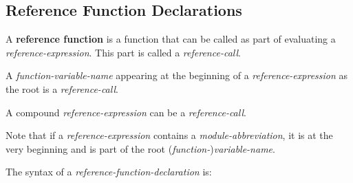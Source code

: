 \documentclass[12pt]{article}
\newcommand{\key}[1]{{\rm \bfseries #1}}
\begin{document}
\subsection{Reference Function Declarations}
\label{REFERENCE-FUNCTION-DECLARATIONS}

A \key{reference function} is a function that can be
called as part of evaluating a {\em reference-expression}.
This part is called a {\em reference-call}\label{REFERENCE-CALL}.


A {\em function-variable-name} appearing at the beginning of
a {\em reference-expression} as the root is a {\em reference-call}.

A compound {\em reference-expression} can be a {\em reference-call}.

Note that if a {\em reference-expression} contains a
{\em module-abbreviation}, it is at the very beginning and
is part of the root ({\em function-}){\em variable-name}.

The syntax of a {\em reference-function-declaration} is:
\end{document}
